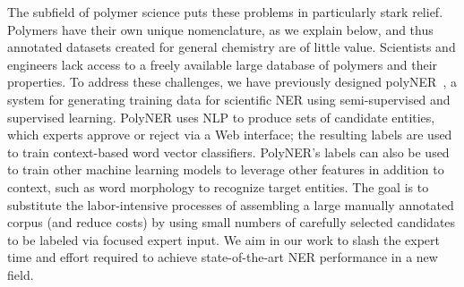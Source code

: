 The subfield of polymer science puts these problems in particularly stark relief.
Polymers have their own unique nomenclature, as we explain below, and thus annotated datasets created for general
chemistry are of little value.
Scientists and engineers lack access to a freely available large database of polymers and their properties.
To address these challenges, we have previously designed polyNER~\cite{tchoua2018towards,tchoua2019polyner}, a system for generating training data for scientific NER using semi-supervised and supervised learning.
PolyNER uses NLP to produce sets of candidate entities, which
experts 
approve or reject via a 
Web interface;
the resulting labels are used to train context-based word vector classifiers. %
PolyNER's labels can also be used to train other machine learning models to leverage other features in addition to context, such as word morphology
to recognize target entities.
The goal is
to substitute the labor-intensive processes of assembling a large
manually annotated corpus (and reduce costs) by using small numbers of carefully selected candidates to be labeled via focused expert input. 
We aim in our work to slash the expert time and effort required to achieve state-of-the-art NER performance
in a new field.


